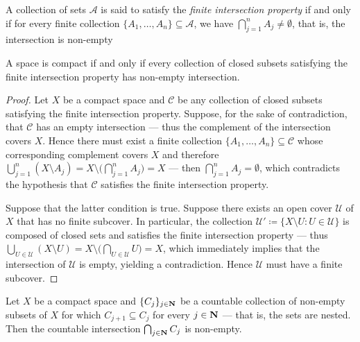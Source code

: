 \begin{definition}
\label{def:finite-intersection-property}
A collection of sets \(\mathcal{A}\) is said to satisfy the
\emph{finite intersection property} if and only if for every finite collection
\(\{A_1, \dots, A_n\} \subseteq \mathcal{A}\), we have
\(\bigcap_{j=1}^n A_j \neq \emptyset\), that is, the intersection is non-empty
\end{definition}

\begin{proposition}
\label{prop:compact-iff-FIP}
A space is compact if and only if every collection of closed subsets satisfying
the finite intersection property has non-empty intersection.
\end{proposition}

\begin{proof}
Let \(X\) be a compact space and \(\mathcal{C}\) be any collection of closed
subsets satisfying the finite intersection property. Suppose, for the sake of
contradiction, that \(\mathcal{C}\) has an empty intersection --- thus the
complement of the intersection covers \(X\). Hence there must exist a finite
collection \(\{A_1, \dots, A_n\} \subseteq \mathcal{C}\) whose corresponding
complement covers \(X\) and therefore
\(\bigcup_{j=1}^n (X \setminus A_j) = X \setminus \big( \bigcap_{j=1}^n A_j \big)
= X\) --- then \(\bigcap_{j=1}^n A_j = \emptyset\), which contradicts the
hypothesis that \(\mathcal{C}\) satisfies the finite intersection property.

Suppose that the latter condition is true. Suppose there exists an open cover
\(\mathcal{U}\) of \(X\) that has no finite subcover. In particular, the
collection \(\mathcal{U}' \coloneq \{X \setminus U : U \in \mathcal{U}\}\) is
composed of closed sets and satisfies the finite intersection property --- thus
\(\bigcup_{U \in \mathcal{U}} (X \setminus U) = X \setminus \big( \bigcap_{U \in
  \mathcal{U}} U \big) = X\), which immediately implies that the intersection of
\(\mathcal{U}\) is empty, yielding a contradiction. Hence \(\mathcal{U}\) must
have a finite subcover.
\end{proof}

\begin{lemma}
\label{lem:cpct-countable-intersection-nested-non-empty}
Let \(X\) be a compact space and \(\{C_j\}_{j \in \mathbf{N}}\) be a countable
collection of non-empty subsets of \(X\) for which \(C_{j+1} \subseteq C_j\) for
every \(j \in \mathbf{N}\) --- that is, the sets are nested. Then the countable
intersection \(\bigcap_{j \in \mathbf{N}} C_j\) is non-empty.
\end{lemma}

